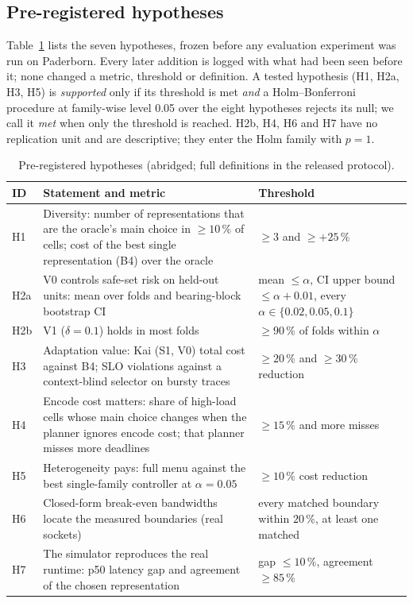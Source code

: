 \subsection{Pre-registered hypotheses}

Table~\ref{tab:hypotheses} lists the seven hypotheses, frozen before any evaluation experiment was
run on Paderborn. Every later addition is logged with what had been seen before it; none changed a
metric, threshold or definition. A tested hypothesis (H1, H2a, H3, H5) is \emph{supported} only if
its threshold is met \emph{and} a Holm--Bonferroni procedure at family-wise level 0.05 over the
eight hypotheses rejects its null; we call it \emph{met} when only the threshold is reached. H2b,
H4, H6 and H7 have no replication unit and are descriptive; they enter the Holm family with
$p = 1$.

\begin{table}[t]
\centering
\caption{Pre-registered hypotheses (abridged; full definitions in the released protocol).}
\label{tab:hypotheses}
\small
\begin{tabular}{lp{}p{}}
\toprule
ID & Statement and metric & Threshold \\
\midrule
H1 & Diversity: number of representations that are the oracle's main choice in $\ge 10\,\%$ of
cells; cost of the best single representation (B4) over the oracle & $\ge 3$ and $\ge +25\,\%$ \\
H2a & V0 controls safe-set risk on held-out units: mean over folds and bearing-block bootstrap CI
& mean $\le \alpha$, CI upper bound $\le \alpha + 0.01$, every $\alpha \in \{0.02, 0.05, 0.1\}$ \\
H2b & V1 ($\delta = 0.1$) holds in most folds & $\ge 90\,\%$ of folds within $\alpha$ \\
H3 & Adaptation value: Kai (S1, V0) total cost against B4; SLO violations against a
context-blind selector on bursty traces & $\ge 20\,\%$ and $\ge 30\,\%$ reduction \\
H4 & Encode cost matters: share of high-load cells whose main choice changes when the planner
ignores encode cost; that planner misses more deadlines & $\ge 15\,\%$ and more misses \\
H5 & Heterogeneity pays: full menu against the best single-family controller at $\alpha = 0.05$
& $\ge 10\,\%$ cost reduction \\
H6 & Closed-form break-even bandwidths locate the measured boundaries (real sockets) & every
matched boundary within $20\,\%$, at least one matched \\
H7 & The simulator reproduces the real runtime: p50 latency gap and agreement of the chosen
representation & gap $\le 10\,\%$, agreement $\ge 85\,\%$ \\
\bottomrule
\end{tabular}
\end{table}

